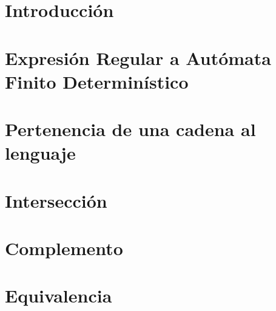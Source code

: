\documentclass[10pt, a4paper]{article}
\begin{document}
	\maketitle
	\tableofcontents

  \newpage
  \section{Introducción}
  

  \newpage
  \section{Expresión Regular a Autómata Finito Determinístico}
  

  \newpage
  \section{Pertenencia de una cadena al lenguaje}
  

  \newpage
  \section{Intersección}
  

  \newpage
  \section{Complemento}
  

  \newpage
  \section{Equivalencia}
  
\end{document}
